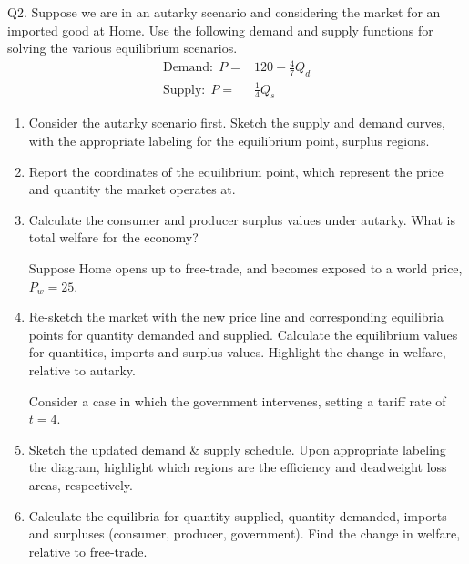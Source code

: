 \documentclass[12pt]{article}
\begin{document}
\newpage

\noindent Q2. Suppose we are in an autarky scenario and considering the market for an imported good at Home. 
Use the following demand and supply functions for solving the various equilibrium scenarios.
\begin{align*}
\text{Demand:} \ \  P =& 120 - \frac{4}{7} Q_d\\
\text{Supply:}\ \  P =& \frac{1}{4} Q_s
\end{align*}

\begin{enumerate}[1)]
	\item Consider the autarky scenario first. Sketch the supply and demand curves, with the appropriate labeling for the equilibrium point, surplus regions.
	
	\vspace{3in}
	
	\item Report the coordinates of the equilibrium point, which represent the price and quantity the market operates at.
	
	\vspace{1in}
	
	
	\newpage
	
	\item Calculate the consumer and producer surplus values under autarky. What is total welfare for the economy?
	
	\vspace{1.4in}
	
	\noindent Suppose Home opens up to free-trade, and becomes exposed to a world price, $P_w = 25$. 
	
	\item Re-sketch the market with the new price line and corresponding equilibria points for quantity demanded and supplied. 
	Calculate the equilibrium values for quantities, imports and surplus values. 
	Highlight the change in welfare, relative to autarky. 
	
	\vspace{4in}
	
	\newpage
	
	\noindent Consider a case in which the government intervenes, setting a tariff rate of $t=4$. 
	
	\item Sketch the updated demand \& supply schedule. Upon appropriate labeling the diagram, highlight which regions are the efficiency and deadweight loss areas, respectively.
	
	\vspace{3.5in}
	
	\item Calculate the equilibria for quantity supplied, quantity demanded, imports and surpluses (consumer, producer, government).
	Find the change in welfare, relative to free-trade. 
	
	\vspace{2in}
	
\end{enumerate}
\end{document}
